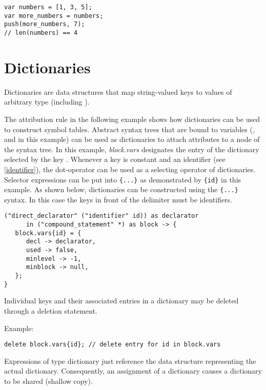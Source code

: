 \begin{lstlisting}
var numbers = [1, 3, 5];
var more_numbers = numbers;
push(more_numbers, 7);
// len(numbers) == 4
\end{lstlisting}

\section{Dictionaries}\label{dictionary}

Dictionaries are data structures that map string-valued keys
to values of arbitrary type (including ).

The attribution rule in the following example shows how dictionaries
can be used to construct symbol tables. Abstract syntax trees that are
bound to variables (,  and  in
this example) can be used as dictionaries to attach attributes to a node
of the syntax tree. In this example, \textit{block.vars} designates the
entry of the dictionary  selected by the key .
Whenever a key is constant and an identifier (see \ref{identifier}),
the dot-operator can be used as a selecting operator of dictionaries.
Selector expressions can be put into \lstinline!{...}! as demonstrated
by \lstinline!{id}! in this example. As shown below, dictionaries can be
constructed using the \lstinline!{...}! syntax. In this case the keys in
front of the \token{->} delimiter must be identifiers.

\begin{lstlisting}
("direct_declarator" ("identifier" id)) as declarator
      in ("compound_statement" *) as block -> {
   block.vars{id} = {
      decl -> declarator,
      used -> false,
      minlevel -> -1,
      minblock -> null,
   };
}
\end{lstlisting}

\noindent
Individual keys and their associated entries in a dictionary
may be deleted through a deletion statement.

\bigskip
\noindent
Example:

\begin{lstlisting}
delete block.vars{id}; // delete entry for id in block.vars
\end{lstlisting}

\noindent
Expressions of type dictionary just reference the data structure
representing the actual dictionary. Consequently, an assignment of a
dictionary causes a dictionary to be shared
(shallow copy).

